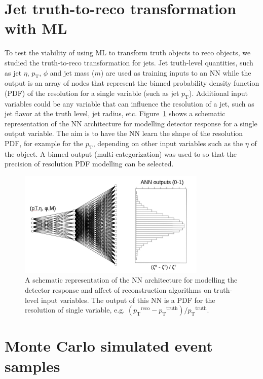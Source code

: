 \documentclass[showpacs,showkeys,preprint,prd,nofootinbib,linenumbers,12pt,superscriptaddress]{revtex4-1}
\def\pt{\ensuremath{p_{\mathrm{T}}}}
\def\ptRes{\ensuremath{(\pt^{\mathrm{reco}}-\pt^{\mathrm{truth}})/\pt^{\mathrm{truth}}}}
\begin{document}
\section{Jet truth-to-reco transformation with ML}

To test the viability of using ML to transform truth objects to reco objects, we studied the truth-to-reco transformation for jets. Jet truth-level quantities, such as jet $\eta$, $\pt$, $\phi$ and jet mass ($m$) are used as training inputs to an NN while the output
is an array of nodes that represent the binned probability density function (PDF) of the resolution for a single variable (such as jet \pt). Additional input variables could be any variable that can influence the resolution of a jet, such as jet flavor at the truth level, jet radius, etc. Figure~\ref{ann_example} shows a schematic representation of the NN architecture for modelling detector response for a single output variable. The aim is to have the NN learn the shape of the resolution PDF, for example for the $\pt$, depending on other input variables such as the $\eta$ of the object. A binned output (multi-categorization) was used to so that the precision of resolution PDF modelling can be selected.

\begin{figure}[h]
  \includegraphics[width=0.8\textwidth]{figures/intro/nn_example.pdf}
  \caption{A schematic representation of the NN architecture for modelling the detector response and affect of reconstruction algorithms on truth-level input variables. The output of this NN is a PDF for the resolution of single variable, e.g. \ptRes.}
  \label{ann_example}
\end{figure}


\section{Monte Carlo simulated event samples}
\end{document}
